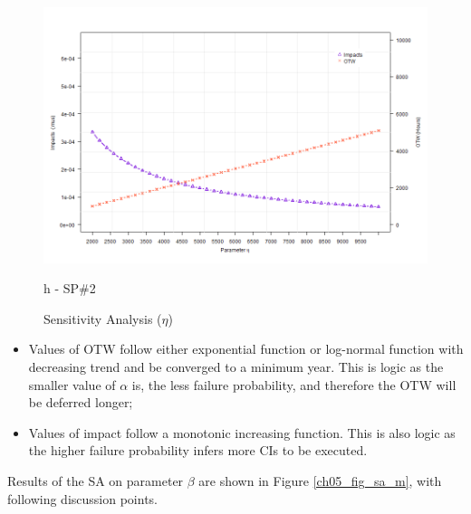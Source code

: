 \begin{figure}[!htb]
\begin{minipage}[b]{0.5\linewidth}
		\includegraphics[width=\textwidth]{figures/ch05_fig_etasa_pump6}
		\caption*{h - SP\#2}
	\end{minipage}
	\caption{Sensitivity Analysis ($\eta$)}
	\label{ch05_fig_sa_alpha}
\end{figure}

\begin{itemize}
\item Values of OTW follow either exponential function or log-normal function with decreasing trend and be converged to a minimum year. This is logic as the smaller value of $\alpha$ is, the less failure probability, and therefore the OTW will be deferred longer;
\item Values of impact follow a monotonic increasing function. This is also logic as the higher failure probability infers more CIs to be executed.
\end{itemize}

Results of the SA on parameter $\beta$ are shown in Figure \ref{ch05_fig_sa_m}, with following discussion points.


